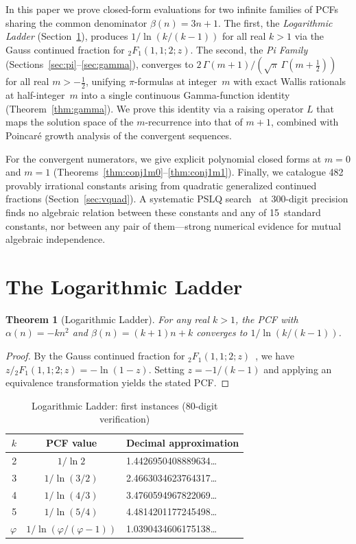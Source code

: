 \documentclass[11pt,a4paper]{article}
\newtheorem{theorem}{Theorem}
\theoremstyle{definition}
\theoremstyle{remark}
\begin{document}
In this paper we prove closed-form evaluations for two infinite
families of PCFs sharing the common denominator $\beta(n) = 3n+1$.
The first, the \emph{Logarithmic Ladder} (Section~\ref{sec:log}),
produces $1/\ln(k/(k{-}1))$ for all real $k > 1$
via the Gauss continued fraction for ${}_2F_1(1,1;2;z)$.
The second, the \emph{Pi Family} (Sections~\ref{sec:pi}--\ref{sec:gamma}),
converges to $2\,\Gamma(m{+}1)/(\sqrt{\pi}\,\Gamma(m{+}\tfrac{1}{2}))$
for all real $m > -\frac{1}{2}$, unifying $\pi$-formulas at integer~$m$
with exact Wallis rationals at half-integer~$m$ into a single
continuous Gamma-function identity (Theorem~\ref{thm:gamma}).
We prove this identity via a raising operator $L$ that maps the
solution space of the $m$-recurrence into that of $m{+}1$, combined
with Poincar\'e growth analysis of the convergent sequences.

For the convergent numerators, we give explicit polynomial closed forms
at $m = 0$ and $m = 1$ (Theorems~\ref{thm:conj1m0}--\ref{thm:conj1m1}).
Finally, we catalogue 482 provably irrational constants arising from
quadratic generalized continued fractions (Section~\ref{sec:vquad}).
A systematic PSLQ search~\cite{ferguson1999} at 300-digit precision
finds no algebraic relation between these constants and any of
15~standard constants, nor between any pair of them---strong numerical
evidence for mutual algebraic independence.

\section{The Logarithmic Ladder}\label{sec:log}

\begin{theorem}[Logarithmic Ladder]\label{thm:log}
For any real $k > 1$, the PCF with $\alpha(n) = -kn^2$ and $\beta(n) = (k{+}1)n + k$
converges to $1/\ln(k/(k{-}1))$.
\end{theorem}

\begin{proof}
By the Gauss continued fraction for ${}_2F_1(1,1;2;z)$~\cite{cuyt2008}, we have
$z/{}_2F_1(1,1;2;z) = -\ln(1-z)$.
Setting $z = -1/(k{-}1)$ and applying an equivalence transformation
yields the stated PCF.
\end{proof}

\begin{table}[h]
\centering
\caption{Logarithmic Ladder: first instances (80-digit verification)}
\begin{tabular}{rcl}
\toprule
$k$ & PCF value & Decimal approximation \\
\midrule
2 & $1/\ln 2$ & 1.4426950408889634\ldots \\
3 & $1/\ln(3/2)$ & 2.4663034623764317\ldots \\
4 & $1/\ln(4/3)$ & 3.4760594967822069\ldots \\
5 & $1/\ln(5/4)$ & 4.4814201177245498\ldots \\
$\varphi$ & $1/\ln(\varphi/(\varphi{-}1))$ & 1.0390434606175138\ldots \\
\bottomrule
\end{tabular}
\end{table}
\end{document}
